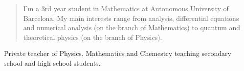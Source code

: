\documentclass[10pt,a4paper,ragged2e,withhyper]{altacv}
\begin{document}
\begin{paracol}{2}






  \newpage

  \switchcolumn

  \begin{quote}
    I'm a 3rd year student in Mathematics at Autonomous University of Bar\-ce\-lo\-na. My main interests range from analysis, differential equations and numerical analysis (on the branch of Mathematics) to quantum and theoretical physics (on the branch of Physics).
  \end{quote}

  Private teacher of Physics, Mathematics and Chemestry teaching secondary school and high school students.



\end{paracol}
\end{document}
